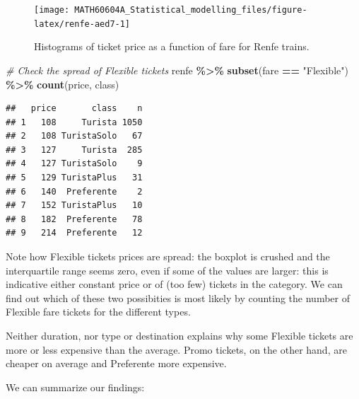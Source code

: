 \documentclass[
  11pt,
  letterpaper,
]{book}
\newenvironment{Shaded}{\begin{snugshade}}{\end{snugshade}}
\newcommand{\CommentTok}[1]{\textcolor[rgb]{0.56,0.35,0.01}{\textit{#1}}}
\newcommand{\KeywordTok}[1]{\textcolor[rgb]{0.13,0.29,0.53}{\textbf{#1}}}
\newcommand{\NormalTok}[1]{#1}
\newcommand{\OperatorTok}[1]{\textcolor[rgb]{0.81,0.36,0.00}{\textbf{#1}}}
\newcommand{\StringTok}[1]{\textcolor[rgb]{0.31,0.60,0.02}{#1}}
\theoremstyle{definition}
\theoremstyle{definition}
\theoremstyle{definition}
\theoremstyle{remark}
\begin{document}
\begin{figure}

{\centering \texttt{[image: MATH60604A\_Statistical\_modelling\_files/figure-latex/renfe-aed7-1]} 

}

\caption{Histograms of ticket price as a function of fare for Renfe trains.}\label{fig:renfe-aed7}
\end{figure}

\begin{Shaded}
\begin{Highlighting}[]
\CommentTok{\# Check the spread of Flexible tickets}
\NormalTok{renfe }\OperatorTok{\%\textgreater{}\%}\StringTok{ }\KeywordTok{subset}\NormalTok{(fare  }\OperatorTok{==}\StringTok{ "Flexible"}\NormalTok{) }\OperatorTok{\%\textgreater{}\%}\StringTok{ }\KeywordTok{count}\NormalTok{(price, class)}
\end{Highlighting}
\end{Shaded}

\begin{verbatim}
##   price       class    n
## 1   108     Turista 1050
## 2   108 TuristaSolo   67
## 3   127     Turista  285
## 4   127 TuristaSolo    9
## 5   129 TuristaPlus   31
## 6   140  Preferente    2
## 7   152 TuristaPlus   10
## 8   182  Preferente   78
## 9   214  Preferente   12
\end{verbatim}

Note how Flexible tickets prices are spread: the boxplot is crushed and the interquartile range seems zero, even if some of the values are larger: this is indicative either constant price or of (too few) tickets in the category. We can find out which of these two possibities is most likely by counting the number of Flexible fare tickets for the different types.

Neither duration, nor type or destination explains why some Flexible tickets are more or less expensive than the average. Promo tickets, on the other hand, are cheaper on average and Preferente more expensive.

We can summarize our findings:
\end{document}
